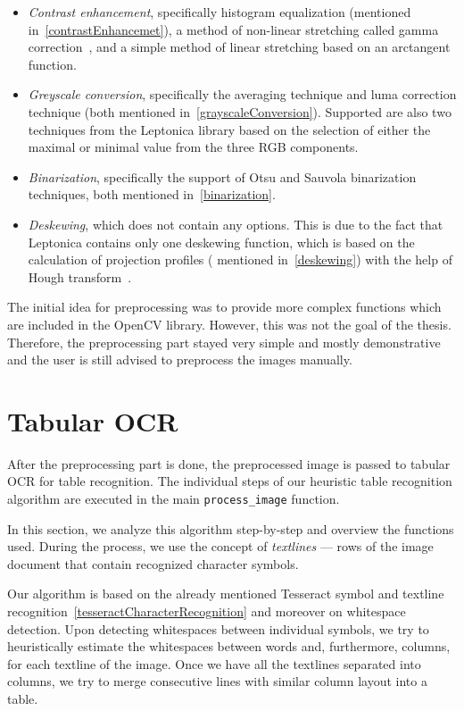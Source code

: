 \begin{itemize}
    \item \emph{Contrast enhancement}, specifically histogram equalization (mentioned in~\cref{contrastEnhancemet}), a method of non-linear stretching called gamma correction~\cite{rahman2016adaptive}, and a simple method of linear stretching based on an arctangent function.
    \item \emph{Greyscale conversion}, specifically the averaging technique and luma correction technique (both mentioned in~\cref{grayscaleConversion}). Supported are also two techniques from the Leptonica library based on the selection of either the maximal or minimal value from the three RGB components.
    \item \emph{Binarization}, specifically the support of Otsu and Sauvola binarization techniques, both mentioned in~\cref{binarization}.
    \item \emph{Deskewing}, which does not contain any options. This is due to the fact that Leptonica contains only one deskewing function, which is based on the calculation of projection profiles ( mentioned in~\cref{deskewing}) with the help of Hough transform~\cite{bloomberg2analysis}.
\end{itemize}

The initial idea for preprocessing was to provide more complex functions which are included in the OpenCV library. However, this was not the goal of the thesis. Therefore, the preprocessing part stayed very simple and mostly demonstrative and the user is still advised to preprocess the images manually.

\section{Tabular OCR}

After the preprocessing part is done, the preprocessed image is passed to tabular OCR for table recognition. The individual steps of our heuristic table recognition algorithm are executed in the main \texttt{process\_image} function.

In this section, we analyze this algorithm step-by-step and overview the functions used. During the process, we use the concept of \emph{textlines} --- rows of the image document that contain recognized character symbols.

Our algorithm is based on the already mentioned Tesseract symbol and textline recognition~\cref{tesseractCharacterRecognition} and moreover on whitespace detection. Upon detecting whitespaces between individual symbols, we try to heuristically estimate the whitespaces between words and, furthermore, columns, for each textline of the image. Once we have all the textlines separated into columns, we try to merge consecutive lines with similar column layout into a table.  

